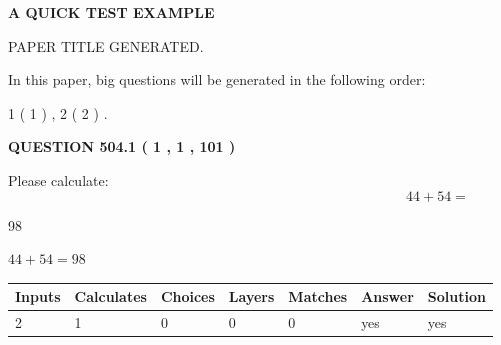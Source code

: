 \documentclass[12pt]{article}
\begin{document}
   
 \vspace{0.2in}
{\LARGE {\textbf{ A QUICK TEST EXAMPLE}}}
   
   
 PAPER TITLE GENERATED.
   
   
   
\vspace{0.2in}
   
In this paper, big questions will be generated in the following order: 
   
   
   1 ( 1 )
 ,
   2 ( 2 )
 .
  
\vspace{0.2in}
  
{\textbf{\Large{QUESTION
504.1 
 ( 1 , 1 , 101 )
}}}
  
  
 
Please calculate:
\begin{equation}
44 +  %
54 = \nonumber
\end{equation}
 
 
 
\noindent{}
 
 

98
 
 
\noindent{}
 
 

 
 
 
\noindent{}
 
 

$ %
44 +  %
54=   %
98$
 
 
\noindent{}
 
 

 
   
   
   
   
\noindent\begin{tabular}{|l|l|l|l|l|l|l|}
 \hline
Inputs & Calculates & Choices & Layers & Matches & Answer & Solution \\ \hline
 2  & 
 1  & 
 0
  & 
 0  & 
 0  & 
  yes & 
  yes 
  \\ \hline
 \end{tabular}
   
   
   
   
\noindent{}
   
\end{document}
